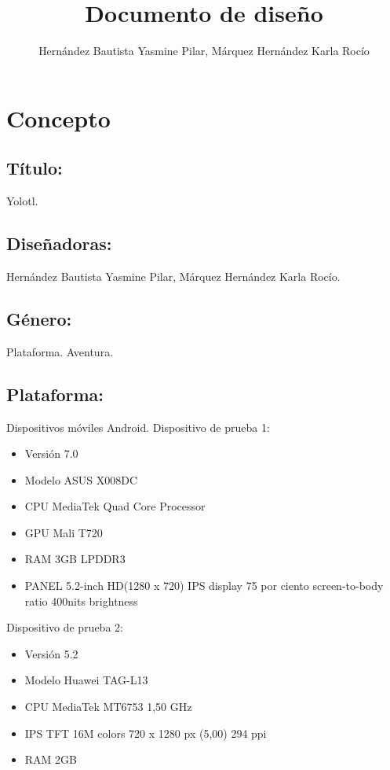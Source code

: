 \documentclass[11pt,letterpaper]{article}
\begin{document}
	\author{Hernández Bautista Yasmine Pilar, Márquez 		Hernández Karla Rocío}
	\title{Documento de diseño}
	\maketitle
	\tableofcontents
	
	\section{Concepto}
		\subsection{Título:} Yolotl.
		\subsection{Diseñadoras:} Hernández Bautista 				Yasmine Pilar, Márquez Hernández Karla Rocío.
    	\subsection{Género:} Plataforma. Aventura.
   		\subsection{Plataforma:} Dispositivos móviles Android. 
   		Dispositivo de prueba 1:
   		\begin{itemize}
   			\item Versión 7.0
   			\item Modelo ASUS X008DC
   			\item CPU MediaTek Quad Core Processor
   			\item GPU Mali T720
   			\item RAM 3GB LPDDR3
   			\item PANEL 5.2-inch
   			HD(1280 x 720) IPS display 
   			75 por ciento screen-to-body ratio
   			400nits brightness 
   		\end{itemize}
   		
   		Dispositivo de prueba 2:
   		\begin{itemize}
   			\item Versión 5.2
   			\item Modelo Huawei TAG-L13
   			\item CPU MediaTek MT6753 1,50 GHz
   			\item IPS TFT 16M colors 720 x 1280 px (5,00) 294 ppi
   			\item RAM 2GB
   			
   		\end{itemize}
   		
\end{document}
